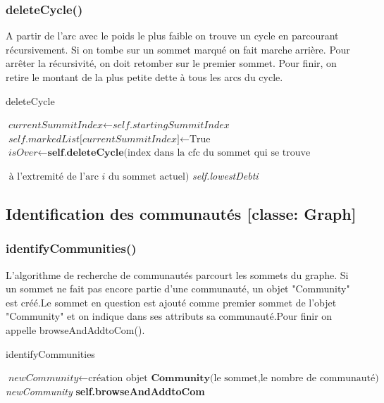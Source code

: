 \documentclass[a4paper]{article}
\begin{document}
\subsubsection{deleteCycle()}
A partir de l'arc avec le poids le plus faible on trouve un cycle en parcourant récursivement. Si on tombe sur un sommet marqué on fait marche arrière. Pour arrêter la récursivité, on doit retomber sur le premier sommet. Pour finir, on retire le montant de la plus petite dette à tous les arcs du cycle.
\begin{algorithm}[H]
\caption{deleteCycle}\label{deleteCycle}
\begin{algorithmic}[1]
\State $\textit{currentSummitIndex}\gets \textit{self.startingSummitIndex}$
\EndIf
{}
\State {}
\State {}
\Else
\State $\textit{self.markedList}\text{[}\textit{currentSummitIndex}\text{]}\gets \text{True}$
\State $\textit{isOver} \gets \textbf{self.deleteCycle}\text{(index dans la cfc du sommet qui se trouve}$

$\text{ à l'extremité de l'arc }\textit{i}\text{ du sommet actuel)}$
\State {}\textit{self.lowestDebt}\textit{i}
\State {}
\EndIf
\EndFor
\State {}
\EndIf
\EndProcedure
\end{algorithmic}
\end{algorithm}
\subsection{Identification des communautés [classe: Graph] }
\subsubsection{identifyCommunities()}
L'algorithme de recherche de communautés parcourt les sommets du graphe. Si un sommet ne fait pas encore partie d'une communauté, un objet "Community" est créé.Le sommet en question est ajouté comme premier sommet de l'objet "Community" et on indique dans ses attributs sa communauté.Pour finir on appelle browseAndAddtoCom().
\begin{algorithm}[H]
\caption{identifyCommunities}\label{identify}
\begin{algorithmic}[1]
\State $\textit{newCommunity}\gets \text{création objet }\textbf{Community}\text{(le sommet,le nombre de communauté)}$
\State {}
\State {}\textit{newCommunity}
\State \textbf{self.browseAndAddtoCom}
\EndIf
\EndFor
\EndProcedure
\end{algorithmic}
\end{algorithm}
\end{document}
